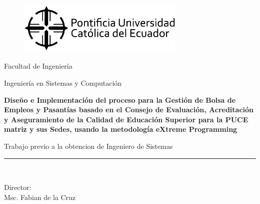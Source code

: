 \documentclass[a4paper,openright,12pt]{book}
\begin{document}
\begin{titlepage}
	\begin{center}
		\vspace*{-1in}
		\begin{figure}[htb]
			\begin{center}
				\includegraphics[width=8cm]{./logos/puce.png}
			\end{center}
		\end{figure}
		Facultad de Ingeniería\\
		\vspace*{0.18in}
		\vspace*{0.6in}
		\begin{large}
			Ingeniería en Sistemas y Computación\\
		\end{large}
		\vspace*{0.2in}
		\begin{Large}
			\textbf{Diseño e Implementación del proceso para la Gestión de Bolsa de Empleos y Pasantías basado en el Consejo de Evaluación, Acreditación y Aseguramiento de la Calidad de Educación Superior para la PUCE matriz y sus Sedes, usando la metodología eXtreme Programming} \\
		\end{Large}
		\vspace*{0.3in}
		\begin{large}
			Trabajo previo a la obtencion de Ingeniero de Sistemas\\
		\end{large}
		\vspace*{0.3in}
		\rule{80mm}{0.1mm}\\
		\vspace*{0.1in}
		\begin{large}
			Director: \\
			Msc. Fabian de la Cruz \\
		\end{large}
	\end{center}
\end{titlepage}
\end{document}
